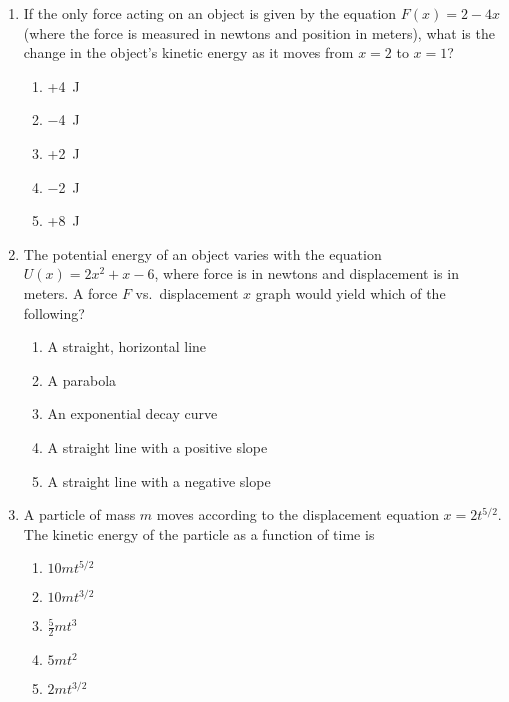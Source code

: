 \documentclass{../../../oss-apphys}
\begin{document}
\begin{multicols}{2}
\begin{enumerate}[leftmargin=18pt,resume]
  \item If the only force acting on an object is given by the equation
    $F(x)=2-4x$ (where the force is measured in newtons and position in meters),
    what is the change in the object's kinetic energy as it moves from $x=2$ to
    $x=1$?
    \begin{enumerate}[nosep,leftmargin=18pt,label=(\Alph*)]
    \item +\SI{4}{\joule}
    \item \SI{-4}{\joule}
    \item +\SI{2}{\joule}
    \item \SI{-2}{\joule}
    \item +\SI{8}{\joule}
    \end{enumerate}
    
  \item The potential energy of an object varies with the equation
    $U(x)=2x^2+x-6$, where force is in newtons and displacement is in meters. A
    force $F$ vs.\ displacement $x$ graph would yield which of the following?
    \begin{enumerate}[nosep,leftmargin=18pt,label=(\Alph*)]
    \item A straight, horizontal line
    \item A parabola
    \item An exponential decay curve
    \item A straight line with a positive slope
    \item A straight line with a negative slope
    \end{enumerate}
    \vspace{.7in}
    
  \item A particle of mass $m$ moves according to the displacement equation
    $x=2t^{5/2}$. The kinetic energy of the particle as a function of time is
    \begin{enumerate}[nosep,leftmargin=18pt,label=(\Alph*)]
    \item $10mt^{5/2}$
    \item $10mt^{3/2}$
    \item $\displaystyle\frac52mt^3$
    \item $5mt^2$
    \item $2mt^{3/2}$
    \end{enumerate}


\end{enumerate}
\end{multicols}
\end{document}
